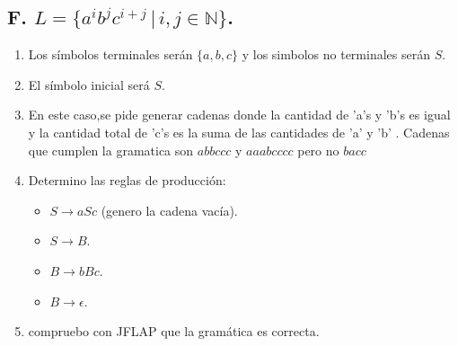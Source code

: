 \documentclass{article}
\begin{document}
        \newpage %
        \subsection*{F. $L = \{a^i b^j c^{i+j} \, | \, i, j \in \mathbb{N}\}$.}
        \begin{flushleft}
            \begin{enumerate}
                \item Los símbolos terminales serán $\{a,b,c\}$ y los simbolos no terminales serán $S$.
                \item El símbolo inicial será $S$.
                \item En este caso,se pide generar cadenas donde 
                la cantidad de 'a's y 'b's es igual y la cantidad total de 'c's es la suma de las cantidades de 'a' y 'b'
                . Cadenas que cumplen la gramatica son $abbccc$ y $aaabcccc$ pero no $bacc$
                \item Determino las reglas de producción:
                \begin{itemize}
                    \item $S \rightarrow aSc$ (genero la cadena vacía).
                    \item $S \rightarrow B$.
                    \item $B \rightarrow bBc$.
                    \item $B \rightarrow \epsilon$.
                \end{itemize}
                \item compruebo con JFLAP que la gramática es correcta.
                

\end{enumerate}
\end{flushleft}
\end{document}
